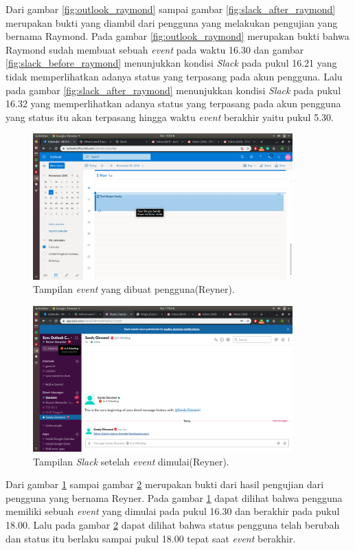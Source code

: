 Dari gambar \ref{fig:outlook_raymond} sampai gambar \ref{fig:slack_after_raymond} merupakan bukti yang diambil dari pengguna yang melakukan pengujian yang bernama Raymond. Pada gambar \ref{fig:outlook_raymond} merupakan bukti bahwa Raymond sudah membuat sebuah \textit{event} pada waktu 16.30 dan gambar \ref{fig:slack_before_raymond} menunjukkan kondisi \textit{Slack} pada pukul 16.21 yang tidak memperlihatkan adanya status yang terpasang pada akun pengguna. Lalu pada gambar \ref{fig:slack_after_raymond} menunjukkan kondisi \textit{Slack} pada pukul 16.32 yang memperlihatkan adanya status yang terpasang pada akun pengguna yang status itu akan terpasang hingga waktu \textit{event} berakhir yaitu pukul 5.30. 
\clearpage

\begin{figure}[h]
  \includegraphics[width=10cm]{./Gambar/PengujianReyner/Outlook.png}
  \centering
  \caption{Tampilan \textit{event} yang dibuat pengguna(Reyner).}
  \label{fig:outlook_reyner}
\end{figure}

\begin{figure}[h]
  \includegraphics[width=10cm]{./Gambar/PengujianReyner/Slack_After.png}
  \centering
  \caption{Tampilan \textit{Slack} setelah \textit{event} dimulai(Reyner).}
  \label{fig:slack_after_reyner}
\end{figure}

Dari gambar \ref{fig:outlook_reyner} sampai gambar \ref{fig:slack_after_reyner} merupakan bukti dari hasil pengujian dari pengguna yang bernama Reyner. Pada gambar \ref{fig:outlook_reyner} dapat dilihat bahwa pengguna memiliki sebuah \textit{event} yang dimulai pada pukul 16.30 dan berakhir pada pukul 18.00. Lalu pada gambar \ref{fig:slack_after_reyner} dapat dilihat bahwa status pengguna telah berubah dan status itu berlaku sampai pukul 18.00 tepat saat \textit{event} berakhir. 
\clearpage


